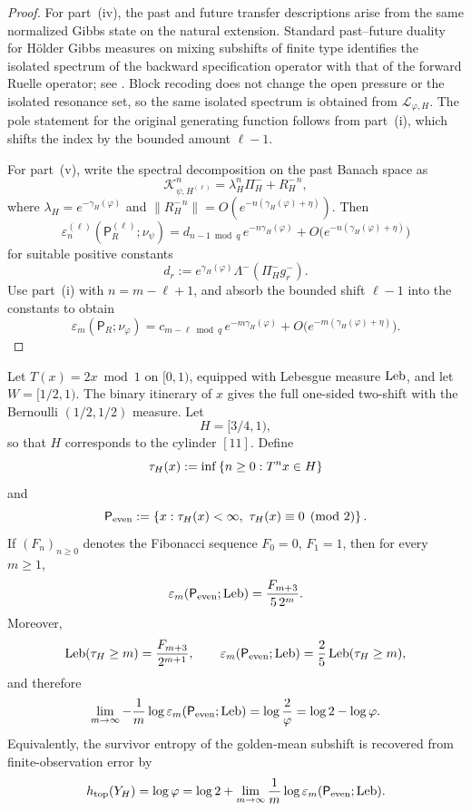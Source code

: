 \begin{proof}
For part~(iv), the past and future transfer descriptions arise from the
same normalized Gibbs state on the natural extension.  Standard
past--future duality for H\"older Gibbs measures on mixing subshifts of
finite type identifies the isolated spectrum of the backward
specification operator with that of the forward Ruelle operator; see
\citet{Bowen2008,Ruelle1978,Walters1975GMeasures}.  Block recoding does
not change the open pressure or the isolated resonance set, so the same
isolated spectrum is obtained from \(\mathcal L_{\varphi,H}\).  The pole
statement for the original generating function follows from part~(i),
which shifts the index by the bounded amount \(\ell-1\).

For part~(v), write the spectral decomposition on the past Banach space
as
\[
  \mathcal K_{\psi,H^{(\ell)}}^n
  = \lambda_H^n\Pi_H^- + R_H^{-\,n},
\]
where \(\lambda_H=e^{-\gamma_H(\varphi)}\) and
\(\|R_H^{-\,n}\|=O(e^{-n(\gamma_H(\varphi)+\eta)})\).  Then
\[
  \varepsilon_n^{(\ell)}
  (\mathsf P_R^{(\ell)};\nu_\psi)
  = d_{n-1\bmod q}\,e^{-n\gamma_H(\varphi)}
    + O\bigl(e^{-n(\gamma_H(\varphi)+\eta)}\bigr)
\]
for suitable positive constants
\[
  d_r:=e^{\gamma_H(\varphi)}
       \Lambda^-(\Pi_H^- g_r^-).
\]
Use part~(i) with \(n=m-\ell+1\), and absorb the bounded shift
\(\ell-1\) into the constants to obtain
\[
  \varepsilon_m(\mathsf P_R;\nu_\varphi)
  = c_{m-\ell\bmod q}\,e^{-m\gamma_H(\varphi)}
    + O\bigl(e^{-m(\gamma_H(\varphi)+\eta)}\bigr).
\]
\end{proof}

\begin{proposition}
\label{prop:doubling-fibonacci-escape}
Let \(T(x)=2x\bmod 1\) on \([0,1)\), equipped with Lebesgue measure
\(\mathrm{Leb}\), and let \(W=[1/2,1)\).  The binary itinerary of \(x\) gives
the full one-sided two-shift with the Bernoulli \((1/2,1/2)\) measure.
Let
\[
  H=[3/4,1),
\]
so that \(H\) corresponds to the cylinder \([11]\).  Define
\[
  \tau_H(x):=\inf\left\{n\geq 0:T^n x\in H\right\}
\]
and
\[
  \mathsf{P}_{\mathrm{even}}
  := \left\{x:\tau_H(x)<\infty,\ \tau_H(x)\equiv 0 \pmod 2\right\}.
\]
If \((F_n)_{n\geq 0}\) denotes the Fibonacci sequence
\(F_0=0\), \(F_1=1\), then for every \(m\geq 1\),
\[
  \varepsilon_m(\mathsf{P}_{\mathrm{even}};\mathrm{Leb})
  = \frac{F_{m+3}}{5\,2^m}.
\]
Moreover,
\[
  \mathrm{Leb}(\tau_H\geq m)=\frac{F_{m+3}}{2^{m+1}},
  \qquad
  \varepsilon_m(\mathsf{P}_{\mathrm{even}};\mathrm{Leb})
  = \frac25\,\mathrm{Leb}(\tau_H\geq m),
\]
and therefore
\[
  \lim_{m\to\infty}
  -\frac1m\log\varepsilon_m(\mathsf{P}_{\mathrm{even}};\mathrm{Leb})
  = \log\frac{2}{\varphi}
  = \log 2-\log\varphi.
\]
Equivalently, the survivor entropy of the golden-mean subshift is
recovered from finite-observation error by
\[
  h_{\mathrm{top}}(Y_H)
  = \log\varphi
  = \log 2
    + \lim_{m\to\infty}\frac1m
      \log \varepsilon_m(\mathsf{P}_{\mathrm{even}};\mathrm{Leb}).
\]
\end{proposition}

